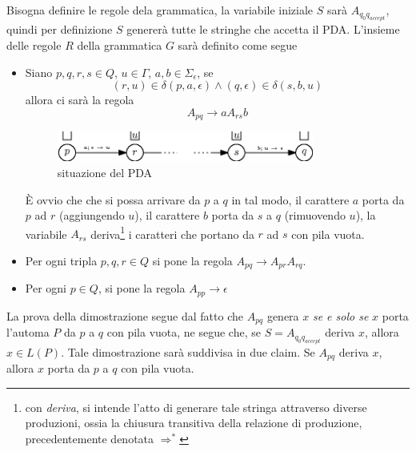 \documentclass[10pt, letterpaper]{report}
\begin{document}
Bisogna definire le regole dela grammatica, la variabile iniziale $S$ sarà $A_{q_0q_{accept}}$, quindi per 
definizione $S$ genererà tutte le stringhe che accetta il PDA. L'insieme delle regole $R$ della grammatica $G$ sarà 
definito come segue \begin{itemize}
    \item Siano $p,q,r,s\in Q$, $u\in\Gamma$, $a,b\in\Sigma_\epsilon$, se $$ (r,u)\in\delta(p,a,\epsilon)\land  
    (q,\epsilon)\in\delta(s,b,u)$$ allora ci sarà la regola $$A_{pq}\longrightarrow aA_{rs}b $$\begin{center}\begin{figure}[h!]
        \centering
        \includegraphics[width=0.8\textwidth ]{images/dimoPDACFG1.eps}
        \caption{situazione del PDA}
        \label{fig:dimoPDACFG1}
    \end{figure}\end{center}
    È ovvio che che si possa arrivare da $p$ a $q$ in tal modo, il carattere $a$ porta da $p$ ad $r$ (aggiungendo $u$), il 
    carattere $b$ porta da $s$ a $q$ (rimuovendo $u$), la variabile $A_{rs}$ deriva\footnote{
        con \textit{deriva}, si intende l'atto di generare tale stringa attraverso diverse produzioni, ossia la 
        chiusura transitiva della relazione di produzione, precedentemente denotata $\Rightarrow^*$
    } i caratteri che portano da $r$ ad $s$ con pila vuota.
    \item Per ogni tripla $p,q,r\in Q$ si pone la regola $A_{pq}\longrightarrow A_{pr}A_{rq}$. 
    \item Per ogni $p\in Q$, si pone la regola $A_{pp}\longrightarrow \epsilon$
\end{itemize}
La prova della dimostrazione segue dal fatto che $A_{pq}$ genera $x$ \textit{se e solo se} $x$ porta l'automa $P$ da 
$p$ a $q$ con pila vuota, ne segue che, se $S=A_{q_0q_{accept}}$ deriva $x$, allora $x\in L(P)$. Tale dimostrazione sarà 
suddivisa in due claim.\acc 
{} Se $A_{pq}$ deriva $x$, allora $x$ porta da $p$ a $q$ con pila vuota. \acc 
\end{document}
